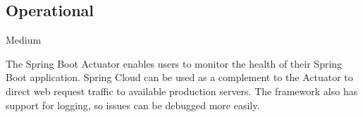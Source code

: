\subsection*{Operational}

\ranking Medium

The Spring Boot Actuator enables users to monitor the health of their Spring Boot application. Spring Cloud can be used as a complement to the Actuator to direct web request traffic to available production servers. The framework also has support for logging, so issues can be debugged more easily.